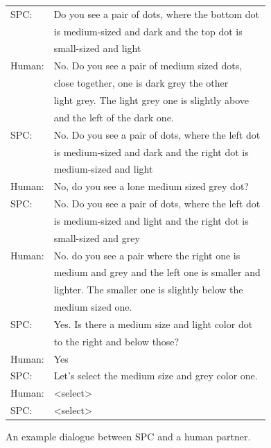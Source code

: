 \documentclass[11pt]{article}
\newcommand{\system}{SPC}
\begin{document}
\begin{figure}[t]
\small
\begin{tabular}[b]{@{}l@{}l@{}}
\toprule
{\color{blue} \system{}}:\;& Do you see a pair of dots, where the bottom dot \\
&is medium-sized and dark and the top dot is \\
&small-sized and light\\
{\color{red} Human}:\;& No. Do you see a pair of medium sized dots, \\
&close together, one is dark grey the other\\
&light grey. The light grey one is slightly above \\
&and the left of the dark one.\\  
{\color{blue} \system{}}:\;& No. Do you see a pair of dots, where the left dot\\
&is medium-sized and dark and the right dot is \\
&medium-sized and light\\
{\color{red} Human}:\;& No, do you see a lone medium sized grey dot?\\
{\color{blue} \system{}}:\;& No. Do you see a pair of dots, where the left dot \\
&is medium-sized and light and the right dot is \\
&small-sized and grey\\
{\color{red} Human}:\;& No. do you see a pair where the right one is \\
&medium and grey and the left one is smaller and \\
&lighter. The smaller one is slightly below the \\
&medium sized one.\\          
{\color{blue} \system{}}:\;& Yes. Is there a medium size and light color dot \\
&to the right and below those?\\
{\color{red} Human}:\;& Yes\\
{\color{blue} \system{}}:\;& Let's select the medium size and grey color one.\\
{\color{red} Human}:\;&<select> \\ %
{\color{blue} \system{}}:\;&<select> \\ %
\bottomrule
\end{tabular}

\vspace{1em}

\caption{
An example dialogue between \system{} and a human partner.
\vspace{1em}
}
\label{fig:ex_gpt}
\end{figure}
\end{document}
